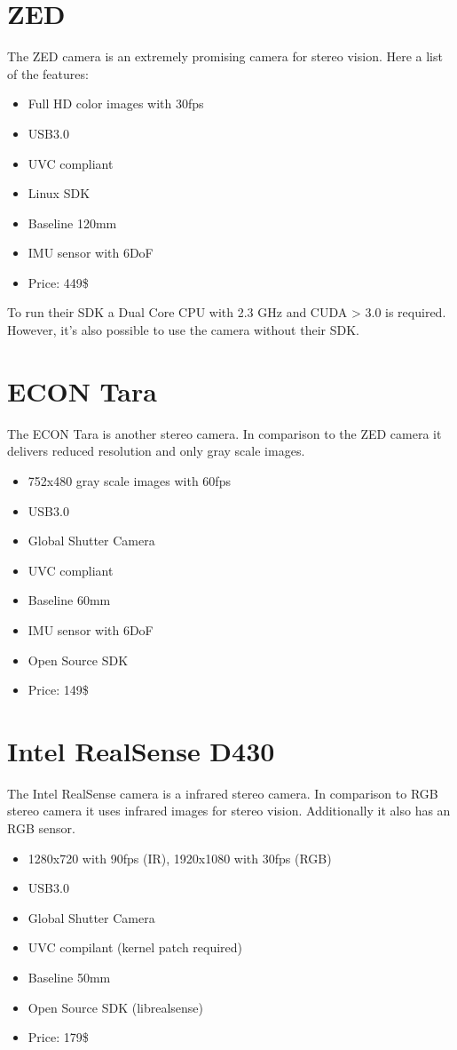 \documentclass[11pt,a4paper,titlepage,oneside]{report}
\begin{document}
\section{ZED}
The ZED camera is an extremely promising camera for stereo vision. Here a list of the features:
\begin{itemize}
	\item Full HD color images with 30fps
	\item USB3.0
	\item UVC compliant
	\item Linux SDK
	\item Baseline 120mm
	\item IMU sensor with 6DoF
	\item Price: 449\$
\end{itemize}

To run their SDK a Dual Core CPU with 2.3 GHz and CUDA > 3.0 is required. However, it's also possible to use the camera without their SDK.

\section{ECON Tara}
The ECON Tara is another stereo camera. In comparison to the ZED camera it delivers reduced resolution and only gray scale images.
\begin{itemize}
	\item 752x480 gray scale images with 60fps
	\item USB3.0
	\item Global Shutter Camera
	\item UVC compliant
	\item Baseline 60mm
	\item IMU sensor with 6DoF
	\item Open Source SDK
	\item Price: 149\$
\end{itemize}

\section{Intel RealSense D430}
The Intel RealSense camera is a infrared stereo camera. In comparison to RGB stereo camera it uses infrared images for stereo vision. Additionally it also has an RGB sensor.
\begin{itemize}
	\item 1280x720 with 90fps (IR), 1920x1080 with 30fps (RGB)
	\item USB3.0
	\item Global Shutter Camera
	\item UVC compilant (kernel patch required)
	\item Baseline 50mm
	\item Open Source SDK (librealsense)
	\item Price: 179\$
\end{itemize}
\end{document}
